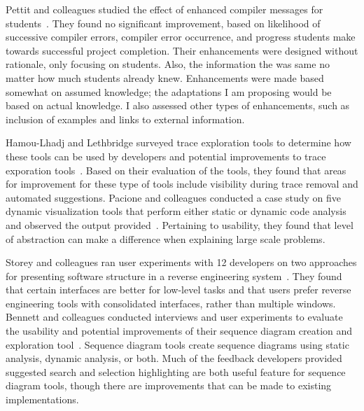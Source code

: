 Pettit and colleagues studied the effect of enhanced compiler messages for students~\cite{pettit2017enhanced}.
They found no significant improvement, based on likelihood of successive compiler errors, compiler error occurrence, and progress students make towards successful project completion.
Their enhancements were designed without rationale, only focusing on students. Also, the information the was same no matter how much students already knew. Enhancements were made based somewhat on assumed knowledge; the adaptations I am proposing would be based on actual knowledge.
I also assessed other types of enhancements, such as inclusion of examples and links to external information.

Hamou-Lhadj and Lethbridge surveyed trace exploration tools to determine how these tools 
can be used by developers and potential improvements to trace exporation tools~\cite{hamou2004survey}. 
Based on their evaluation of the tools, they found that areas 
for improvement for these type of tools include visibility during trace removal and automated suggestions.
Pacione and colleagues conducted a case study on five dynamic visualization tools that perform either static or dynamic code analysis and observed the output provided~\cite{pacione2003comparative}. Pertaining to usability, they found that level of abstraction can make a difference when explaining large scale problems.

Storey and colleagues ran user experiments with 12 developers on two approaches for presenting software structure in a reverse engineering system~\cite{storey1997rigi}. They found that certain interfaces are better for low-level tasks and that users prefer reverse engineering tools with consolidated interfaces, rather than multiple windows.
Bennett and colleagues conducted interviews and user experiments to evaluate the usability and potential improvements of their sequence diagram creation and exploration tool~\cite{bennett2008survey}. Sequence diagram tools create sequence diagrams using static analysis, dynamic analysis, or both.
Much of the feedback developers provided suggested search and selection highlighting are both useful feature for sequence diagram tools, though there are improvements that can be made to existing implementations.


